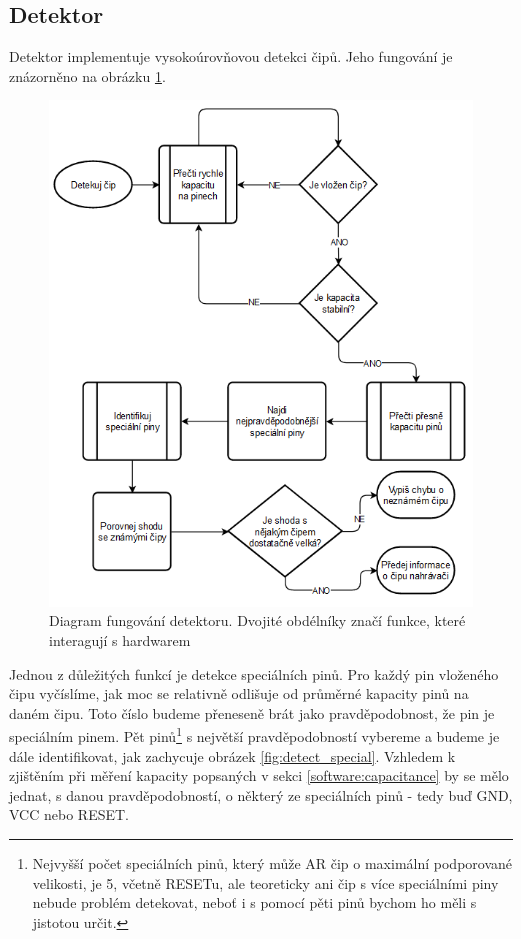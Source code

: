 \documentclass[11pt,a4paper,twoside,openright]{report}
\begin{document}
\subsection {Detektor}

Detektor implementuje vysokoúrovňovou detekci čipů. Jeho fungování je znázorněno na obrázku \ref{fig:detector}. 

\begin{figure}
  \includegraphics[width=0.75\linewidth]{img/detector_diagram.png}
  \centering
  \caption{Diagram fungování detektoru. Dvojité obdélníky značí funkce, které interagují s hardwarem}
  \label{fig:detector}
\end{figure}

Jednou z důležitých funkcí je detekce speciálních pinů. Pro každý pin vloženého čipu vyčíslíme, jak moc se relativně odlišuje od průměrné kapacity pinů na daném čipu. Toto číslo budeme přeneseně brát jako pravděpodobnost, že pin je speciálním pinem. Pět pinů\footnote{Nejvyšší počet speciálních pinů, který může AR čip o maximální podporované velikosti, je 5, včetně RESETu, ale teoreticky ani čip s více speciálními piny nebude problém detekovat, neboť i s pomocí pěti pinů bychom ho měli s jistotou určit.} s největší pravděpodobností vybereme a budeme je dále identifikovat, jak zachycuje obrázek \ref{fig:detect_special}.
Vzhledem k zjištěním při měření kapacity popsaných v sekci \ref{software:capacitance} by se mělo jednat, s danou pravděpodobností, o některý ze speciálních pinů - tedy buď GND, VCC nebo RESET.
\end{document}
